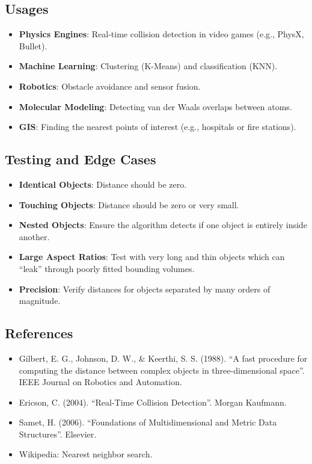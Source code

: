 \subsection{Usages}

\begin{itemize}
\item \textbf{Physics Engines}: Real-time collision detection in video games (e.g., PhysX, Bullet).
\item \textbf{Machine Learning}: Clustering (K-Means) and classification (KNN).
\item \textbf{Robotics}: Obstacle avoidance and sensor fusion.
\item \textbf{Molecular Modeling}: Detecting van der Waals overlaps between atoms.
\item \textbf{GIS}: Finding the nearest points of interest (e.g., hospitals or fire stations).
\end{itemize}

\subsection{Testing and Edge Cases}

\begin{itemize}
\item \textbf{Identical Objects}: Distance should be zero.
\item \textbf{Touching Objects}: Distance should be zero or very small.
\item \textbf{Nested Objects}: Ensure the algorithm detects if one object is entirely inside another.
\item \textbf{Large Aspect Ratios}: Test with very long and thin objects which can ``leak'' through poorly fitted bounding volumes.
\item \textbf{Precision}: Verify distances for objects separated by many orders of magnitude.
\end{itemize}

\subsection{References}

\begin{itemize}
\item Gilbert, E. G., Johnson, D. W., \& Keerthi, S. S. (1988). ``A fast procedure for computing the distance between complex objects in three-dimensional space''. IEEE Journal on Robotics and Automation.
\item Ericson, C. (2004). ``Real-Time Collision Detection''. Morgan Kaufmann.
\item Samet, H. (2006). ``Foundations of Multidimensional and Metric Data Structures''. Elsevier.
\item Wikipedia: Nearest neighbor search.
\end{itemize}

